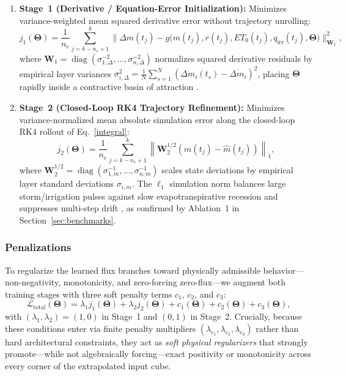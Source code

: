 \documentclass[pdflatex,sn-nature]{sn-jnl}%
\theoremstyle{thmstyleone}%
\theoremstyle{thmstyletwo}%
\theoremstyle{thmstylethree}%
\begin{document}
\begin{enumerate}
    \item \textbf{Stage~1 (Derivative / Equation-Error Initialization):} Minimizes variance-weighted mean squared derivative error without trajectory unrolling:
    \begin{equation}
        j_{1}(\boldsymbol{\Theta}) = 
        \frac{1}{n_e} \sum_{j = k - n_e + 1}^{k} 
        \bigl\| 
            \Delta m(t_j) - g\bigl(m(t_j), r(t_j), ET_0(t_j), q_{\mathrm{irr}}(t_j), \boldsymbol{\Theta}\bigr)
        \bigr\|_{\mathbf{W}_1}^2,
        \label{eq:j1}
    \end{equation}
    where $\mathbf{W}_1 = \operatorname{diag}(\sigma_{1,\Delta}^{-2}, \dots, \sigma_{n,\Delta}^{-2})$ normalizes squared derivative residuals by empirical layer variances $\sigma_{i,\Delta}^2 = \frac{1}{N}\sum_{s=1}^N (\Delta m_i(t_s) - \overline{\Delta m_i})^2$, placing $\boldsymbol{\Theta}$ rapidly inside a contractive basin of attraction \cite{Bradley2021, Ribeiro2020}.

    \item \textbf{Stage~2 (Closed-Loop RK4 Trajectory Refinement):} Minimizes variance-normalized mean absolute simulation error along the closed-loop RK4 rollout of Eq.~\eqref{integral}:
    \begin{equation}
        j_{2}(\boldsymbol{\Theta}) = 
        \frac{1}{n_e} \sum_{j = k - n_e + 1}^{k} 
        \left\| 
            \mathbf{W}_2^{1/2}\!\left(m(t_j) - \hat{m}(t_j)\right)
        \right\|_{1},
        \label{eq:j2}
    \end{equation}
    where $\mathbf{W}_2^{1/2} = \operatorname{diag}(\sigma_{1,m}^{-1}, \dots, \sigma_{n,m}^{-1})$ scales state deviations by empirical layer standard deviations $\sigma_{i,m}$. The $\ell_1$ simulation norm balances large storm/irrigation pulses against slow evapotranspirative recession and suppresses multi-step drift \cite{Aguirre2010}, as confirmed by Ablation~1 in Section~\ref{sec:benchmarks}.
\end{enumerate}

\subsubsection{Penalizations}
To regularize the learned flux branches toward physically admissible behavior—non-negativity, monotonicity, and zero-forcing zero-flux—we augment both training stages with three soft penalty terms $c_1$, $c_2$, and $c_3$:
\[
\mathcal{L}_{\mathrm{total}}(\boldsymbol{\Theta}) = \lambda_1 j_1(\boldsymbol{\Theta}) + \lambda_2 j_2(\boldsymbol{\Theta}) + c_1(\boldsymbol{\Theta}) + c_2(\boldsymbol{\Theta}) + c_3(\boldsymbol{\Theta}),
\]
with $(\lambda_1, \lambda_2) = (1, 0)$ in Stage~1 and $(0, 1)$ in Stage~2. Crucially, because these conditions enter via finite penalty multipliers $(\lambda_{c_1}, \lambda_{c_2}, \lambda_{c_3})$ rather than hard architectural constraints, they act as \emph{soft physical regularizers} that strongly promote—while not algebraically forcing—exact positivity or monotonicity across every corner of the extrapolated input cube.
\end{document}
